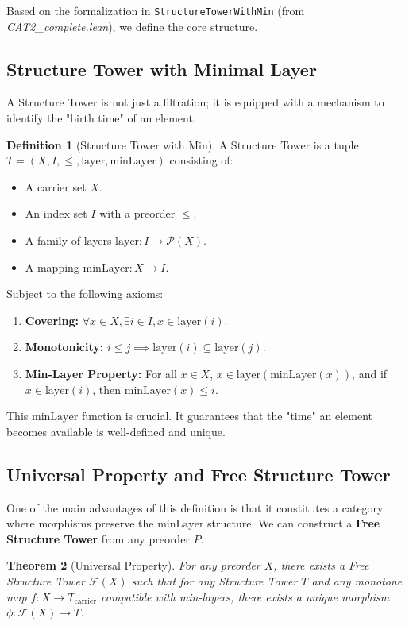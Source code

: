 \documentclass[11pt, a4paper]{article}
\theoremstyle{definition}
\newtheorem{definition}{Definition}[section]
\theoremstyle{plain}
\newtheorem{theorem}[definition]{Theorem}
\newcommand{\minLayer}{\mathrm{minLayer}}
\begin{document}
Based on the formalization in \texttt{StructureTowerWithMin} (from \textit{CAT2\_complete.lean}), we define the core structure.

\subsection{Structure Tower with Minimal Layer}

A Structure Tower is not just a filtration; it is equipped with a mechanism to identify the "birth time" of an element.

\begin{definition}[Structure Tower with Min]
A Structure Tower is a tuple $T = (X, I, \le, \mathrm{layer}, \minLayer)$ consisting of:
\begin{itemize}
    \item A carrier set $X$.
    \item An index set $I$ with a preorder $\le$.
    \item A family of layers $\mathrm{layer}: I \to \mathcal{P}(X)$.
    \item A mapping $\minLayer: X \to I$.
\end{itemize}
Subject to the following axioms:
\begin{enumerate}
    \item \textbf{Covering:} $\forall x \in X, \exists i \in I, x \in \mathrm{layer}(i)$.
    \item \textbf{Monotonicity:} $i \le j \implies \mathrm{layer}(i) \subseteq \mathrm{layer}(j)$.
    \item \textbf{Min-Layer Property:} For all $x \in X$, $x \in \mathrm{layer}(\minLayer(x))$, and if $x \in \mathrm{layer}(i)$, then $\minLayer(x) \le i$.
\end{enumerate}
\end{definition}

This $\minLayer$ function is crucial. It guarantees that the "time" an element becomes available is well-defined and unique.

\subsection{Universal Property and Free Structure Tower}

One of the main advantages of this definition is that it constitutes a category where morphisms preserve the $\minLayer$ structure. We can construct a \textbf{Free Structure Tower} from any preorder $P$.

\begin{theorem}[Universal Property]
For any preorder $X$, there exists a Free Structure Tower $\mathcal{F}(X)$ such that for any Structure Tower $T$ and any monotone map $f: X \to T_{\mathrm{carrier}}$ compatible with min-layers, there exists a unique morphism $\phi: \mathcal{F}(X) \to T$.
\end{theorem}
\end{document}
